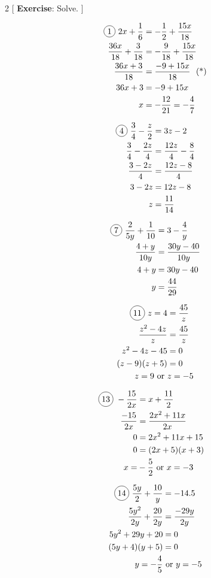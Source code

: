 \begin{multicols}{2}
[
  \textbf{Exercise}: Solve.
]

\begin{align*}
  \circled{1}\ 2x+\frac{1}{6}&=-\frac{1}{2}+\frac{15x}{18}\\
  \frac{36x}{18}+\frac{3}{18}&=-\frac{9}{18}+\frac{15x}{18}\\
  \frac{36x+3}{18}&=\frac{-9+15x}{18}\ \text{ (*)}\\
  36x+3&=-9+15x\\
  x&=-\frac{12}{21}=-\frac{4}{7}
\end{align*}

\begin{align*}
  \circled{4}\ \frac{3}{4}-\frac{z}{2}&=3z-2\\
  \frac{3}{4}-\frac{2z}{4}&=\frac{12z}{4}-\frac{8}{4}\\
  \frac{3-2z}{4}&=\frac{12z-8}{4}\\
  3-2z&=12z-8\\
  z&=\frac{11}{14}
\end{align*}

\begin{align*}
  \circled{7}\ \frac{2}{5y}+\frac{1}{10}&=3-\frac{4}{y}\\
  \frac{4+y}{10y}&=\frac{30y-40}{10y}\\
  4+y&=30y-40\\
  y&=\frac{44}{29}
\end{align*}

\begin{align*}
  \circled{11}\ z=4&=\frac{45}{z}\\
  \frac{z^{2}-4z}{z}&=\frac{45}{z}\\
  z^{2}-4z-45&=0\\
  (z-9)(z+5)&=0\\
  z=9 \text{ or }&z=-5
\end{align*}

\begin{align*}
  \circled{13}\ -\frac{15}{2x}&=x+\frac{11}{2}\\
  \frac{-15}{2x}&=\frac{2x^{2}+11x}{2x}\\
  0&=2x^{2}+11x+15&\\
  0&=(2x+5)(x+3)\\
  x=&-\frac{5}{2} \text{ or }x=-3
\end{align*}

\begin{align*}
  \circled{14}\ \frac{5y}{2}+\frac{10}{y}&=-14.5\\
  \frac{5y^{2}}{2y}+\frac{20}{2y}&=\frac{-29y}{2y}\\
  5y^{2}+29y+20&=0\\
  (5y+4)(y+5)&=0\\
  y=-\frac{4}{5} &\text{ or }y=-5
\end{align*}


\end{multicols}
